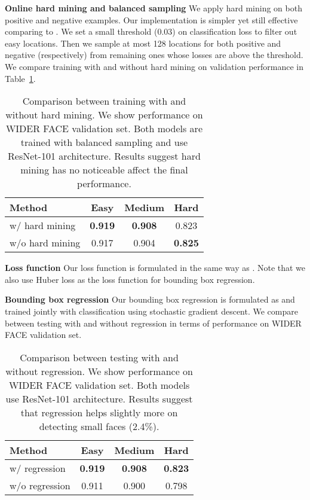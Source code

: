 \documentclass[10pt,twocolumn,letterpaper]{article}
\begin{document}
{\bf Online hard mining and balanced sampling} We apply hard mining on both positive and negative examples. Our implementation is simpler yet still effective comparing to \cite{shrivastava2016training}. We set a small threshold (0.03) on classification loss to filter out easy locations. Then we sample at most 128 locations for both positive and negative (respectively) from remaining ones whose losses are above the threshold. We compare training with and without hard mining on validation performance in Table~\ref{tab:hardmine}. 
\begin{table}
  \centering 
  \begin{tabular}{l|ccc}
    Method          & Easy  & Medium & Hard  \\
    \hline \hline
    w/  hard mining & {\bf 0.919} & {\bf 0.908}  & 0.823 \\
    w/o hard mining & 0.917 & 0.904  & {\bf 0.825} \\  
  \end{tabular}
  \caption{Comparison between training with and without hard mining. We show performance on WIDER FACE validation set. Both models are trained with balanced sampling and use ResNet-101 architecture. Results suggest hard mining has no noticeable affect the final performance. }
  \label{tab:hardmine}
\end{table}

{\bf Loss function} Our loss function is formulated in the same way as \cite{ren2015faster}. Note that we also use Huber loss as the loss function for bounding box regression.

{\bf Bounding box regression} Our bounding box regression is formulated as \cite{ren2015faster} and trained jointly with classification using stochastic gradient descent. We compare between testing with and without regression in terms of performance on WIDER FACE validation set. 
\begin{table}
  \centering 
  \begin{tabular}{l|ccc}
    Method         & Easy  & Medium & Hard  \\
    \hline \hline
    w/  regression & {\bf 0.919} & {\bf 0.908} & {\bf 0.823} \\
    w/o regression & 0.911 & 0.900  & 0.798 \\  
  \end{tabular}
  \caption{Comparison between testing with and without regression. We show performance on WIDER FACE validation set. Both models use ResNet-101 architecture. Results suggest that regression helps slightly more on detecting small faces (2.4\%).}
  \label{tab:reg}
\end{table}
\end{document}
